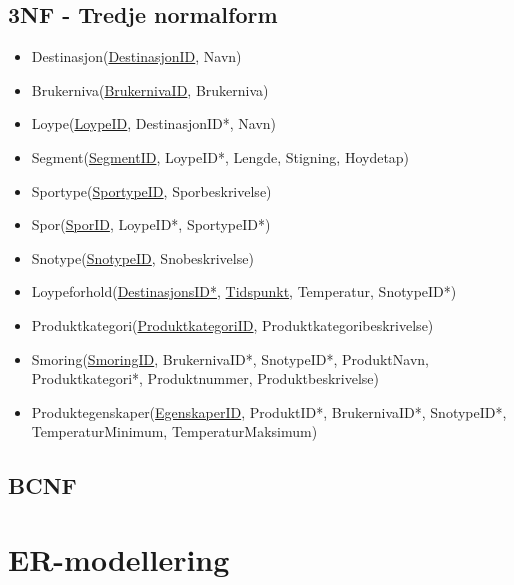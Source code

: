 \documentclass[10pt, a4paper]{article}
\begin{document}
\subsection{3NF - Tredje normalform}

\begin{itemize}
	\item Destinasjon(\underline{DestinasjonID}, Navn) 
	\item Brukerniva(\underline{BrukernivaID}, Brukerniva)
	\item Loype(\underline{LoypeID}, DestinasjonID*, Navn) 
	\item Segment(\underline{SegmentID}, LoypeID*, Lengde, Stigning, Hoydetap) 
	\item Sportype(\underline{SportypeID}, Sporbeskrivelse)
	\item Spor(\underline{SporID}, LoypeID*, SportypeID*)
	\item Snotype(\underline{SnotypeID}, Snobeskrivelse) 
	\item Loypeforhold(\underline{DestinasjonsID*}, \underline{Tidspunkt}, Temperatur, SnotypeID*) 
	\item Produktkategori(\underline{ProduktkategoriID}, Produktkategoribeskrivelse) 
	\item Smoring(\underline{SmoringID}, BrukernivaID*, SnotypeID*, ProduktNavn, Produktkategori*, Produktnummer, Produktbeskrivelse)
	\item Produktegenskaper(\underline{EgenskaperID}, ProduktID*, BrukernivaID*, SnotypeID*, TemperaturMinimum, TemperaturMaksimum)
\end{itemize}




























\subsection{BCNF}

\hfill \break

\section{ER-modellering}
\end{document}
